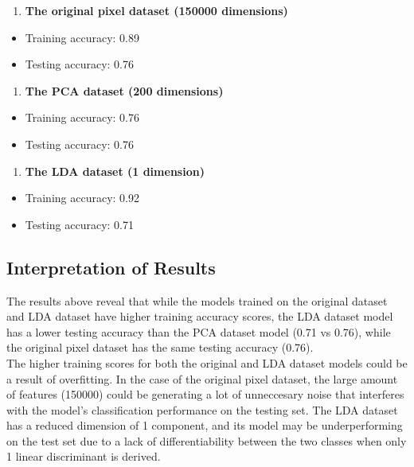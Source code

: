 \documentclass[11pt]{article}
\providecommand{\tightlist}{%
      \setlength{\itemsep}{0pt}\setlength{\parskip}{0pt}}
\begin{document}
\begin{enumerate}
\def\labelenumi{\arabic{enumi})}
\tightlist
\item
  \textbf{The original pixel dataset (150000 dimensions)}
\end{enumerate}

\begin{itemize}
\tightlist
\item
  Training accuracy: 0.89
\item
  Testing accuracy: 0.76
\end{itemize}

\begin{enumerate}
\def\labelenumi{\arabic{enumi})}
\setcounter{enumi}{1}
\tightlist
\item
   \textbf{The PCA dataset (200 dimensions)}
\end{enumerate}

\begin{itemize}
\tightlist
\item
  Training accuracy: 0.76
\item
  Testing accuracy: 0.76
\end{itemize}

\begin{enumerate}
\def\labelenumi{\arabic{enumi})}
\setcounter{enumi}{2}
\tightlist
\item
  \textbf{ The LDA dataset (1 dimension)}
\end{enumerate}

\begin{itemize}
\tightlist
\item
  Training accuracy: 0.92
\item
  Testing accuracy: 0.71
\end{itemize}

\subsection{Interpretation of Results}

The results above reveal that while the models trained on the original
dataset and LDA dataset have higher training accuracy scores, the LDA
dataset model has a lower testing accuracy than the PCA dataset model
(0.71 vs 0.76), while the original pixel dataset has the same testing
accuracy (0.76).\\

The higher training scores for both the original and LDA dataset models
could be a result of overfitting. In the case of the original pixel
dataset, the large amount of features (150000) could be generating a lot
of unneccesary noise that interferes with the model's classification
performance on the testing set. The LDA dataset has a reduced dimension
of 1 component, and its model may be underperforming on the test set due
to a lack of differentiability between the two classes when only 1
linear discriminant is derived.\\
\end{document}
